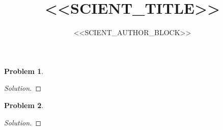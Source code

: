 \documentclass[11pt,a4paper]{article}
\title{<<SCIENT_TITLE>>}
\author{<<SCIENT_AUTHOR_BLOCK>>}
\date{}
\theoremstyle{definition}
\newtheorem{problem}{Problem}
\begin{document}
\maketitle

\begin{problem}
\end{problem}

\begin{proof}[Solution]
\end{proof}

\begin{problem}
\end{problem}

\begin{proof}[Solution]
\end{proof}
\end{document}
